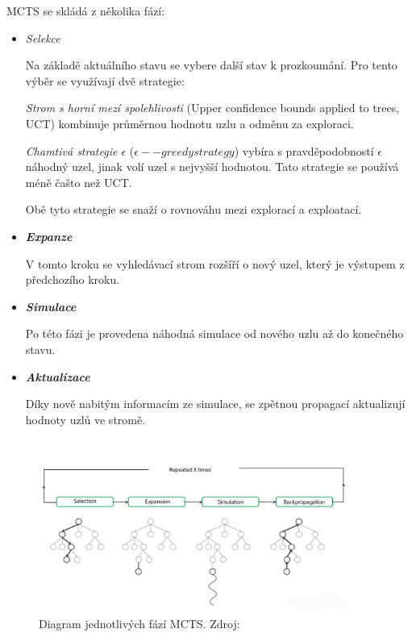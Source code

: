 MCTS se skládá z několika fází:
\begin{itemize}
  \item \emph{Selekce}

  Na základě aktuálního stavu se vybere další stav k prozkoumání.
  Pro tento výběr se využívají dvě strategie:
  
  \emph{Strom s horní mezí spolehlivosti} (Upper confidence bounds applied to trees, UCT) kombinuje průměrnou hodnotu uzlu a odměnu za exploraci.

  \label{epsilon_greedy}
  \emph{Chamtivá strategie $\epsilon$ } ($\epsilon--greedy strategy$) vybíra s pravděpodobností $\epsilon$ náhodný uzel, jinak volí uzel s nejvyšší hodnotou.
  Tato strategie se používá méně čašto než UCT\@.

  Obě tyto strategie se snaží o rovnováhu mezi explorací a exploatací.
  \item \textbf{\emph{Expanze}}

  V tomto kroku se vyhledávací strom rozšíří o nový uzel, který je výstupem z předchozího kroku.

  \item \textbf{\emph{Simulace}}

  Po této fázi je provedena náhodná simulace od nového uzlu až do konečného stavu.

  \item \textbf{\emph{Aktualizace}}
  
  Díky nově nabitým informacím ze simulace, se zpětnou propagací aktualizují hodnoty uzlů ve stromě.

\end{itemize}

\begin{figure}[!h]
	\centering
	\includegraphics[width=0.9\textwidth]{obrazky-figures/mcts}
	\caption{Diagram jednotlivých fází MCTS.
  Zdroj:\cite{Monte_Carlo_Tree_Search}}\label{fig:mcts}
\end{figure}

